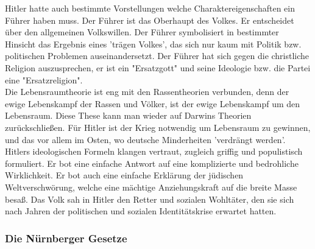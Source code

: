 \documentclass[letterpaper, 12pt]{article}
\let\tempsubsubsection\subsubsection
\renewcommand\subsubsection[1]{\vspace{0cm}\tempsubsubsection{#1}\vspace{0cm}}
\begin{document}
Hitler hatte auch bestimmte Vorstellungen welche Charaktereigenschaften ein Führer haben muss. Der Führer ist das Oberhaupt des Volkes. Er entscheidet über den allgemeinen Volkswillen. Der Führer symbolisiert in bestimmter Hinsicht das Ergebnis eines 'trägen Volkes', das sich nur kaum mit Politik bzw. politischen Problemen auseinandersetzt. Der Führer hat sich gegen die christliche Religion auszusprechen, er ist ein "Ersatzgott" und seine Ideologie bzw. die Partei eine "Ersatzreligion". \\
Die Lebensraumtheorie ist eng mit den Rassentheorien verbunden, denn der ewige Lebenskampf der Rassen und Völker, ist der ewige Lebenskampf um den Lebensraum. Diese These kann man wieder auf Darwins Theorien zurückschließen. Für Hitler ist der Krieg notwendig um Lebensraum zu gewinnen, und das vor allem im Osten, wo deutsche Minderheiten 'verdrängt werden'. \\
Hitlers ideologischen Formeln klangen vertraut, zugleich griffig und populistisch formuliert. Er bot eine einfache Antwort auf eine komplizierte und bedrohliche Wirklichkeit. Er bot auch eine einfache Erklärung der jüdischen Weltverschwörung, welche eine mächtige Anziehungskraft auf die breite Masse besaß. Das Volk sah in Hitler den Retter und sozialen Wohltäter, den sie sich nach Jahren der politischen und sozialen Identitätskrise erwartet hatten. \clearpage






\subsubsection{Die Nürnberger Gesetze}

\clearpage


\end{document}
